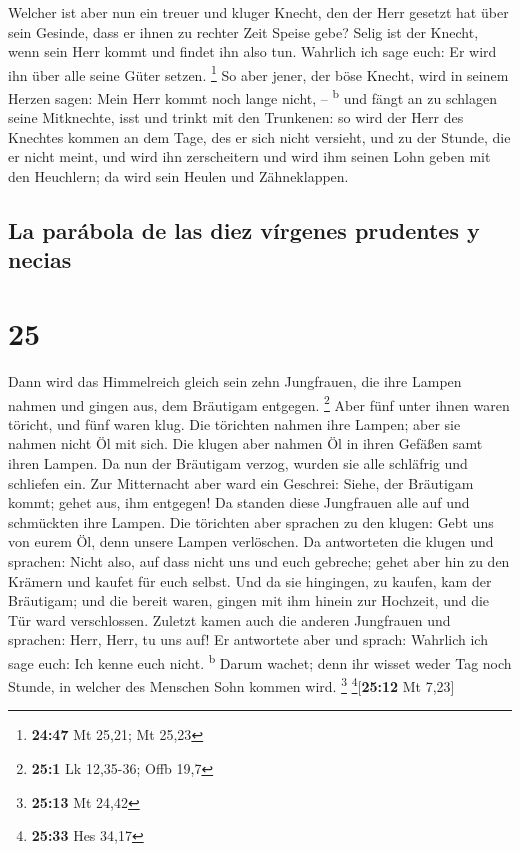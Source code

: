  Welcher ist aber nun ein treuer und kluger Knecht, den
der Herr gesetzt hat über sein Gesinde, dass er ihnen zu rechter Zeit
Speise gebe?  Selig ist der Knecht, wenn sein Herr kommt
und findet ihn also tun.  Wahrlich ich sage euch: Er wird
ihn über alle seine Güter setzen. \footnote{\textbf{24:47} Mt 25,21; Mt
  25,23}  So aber jener, der böse Knecht, wird in seinem
Herzen sagen: Mein Herr kommt noch lange nicht, -- \textsuperscript{b}
 und fängt an zu schlagen seine Mitknechte, isst und
trinkt mit den Trunkenen:  so wird der Herr des Knechtes
kommen an dem Tage, des er sich nicht versieht, und zu der Stunde, die
er nicht meint,  und wird ihn zerscheitern und wird ihm
seinen Lohn geben mit den Heuchlern; da wird sein Heulen und
Zähneklappen.

\hypertarget{la-paruxe1bola-de-las-diez-vuxedrgenes-prudentes-y-necias}{%
\subsection{La parábola de las diez vírgenes prudentes y
necias}\label{la-paruxe1bola-de-las-diez-vuxedrgenes-prudentes-y-necias}}

\hypertarget{section-24}{%
\section{25}\label{section-24}}

 Dann wird das Himmelreich gleich sein zehn Jungfrauen,
die ihre Lampen nahmen und gingen aus, dem Bräutigam entgegen.
\footnote{\textbf{25:1} Lk 12,35-36; Offb 19,7}  Aber fünf
unter ihnen waren töricht, und fünf waren klug.  Die
törichten nahmen ihre Lampen; aber sie nahmen nicht Öl mit sich.
 Die klugen aber nahmen Öl in ihren Gefäßen samt ihren
Lampen.  Da nun der Bräutigam verzog, wurden sie alle
schläfrig und schliefen ein.  Zur Mitternacht aber ward
ein Geschrei: Siehe, der Bräutigam kommt; gehet aus, ihm entgegen!
 Da standen diese Jungfrauen alle auf und schmückten ihre
Lampen.  Die törichten aber sprachen zu den klugen: Gebt
uns von eurem Öl, denn unsere Lampen verlöschen.  Da
antworteten die klugen und sprachen: Nicht also, auf dass nicht uns und
euch gebreche; gehet aber hin zu den Krämern und kaufet für euch selbst.
 Und da sie hingingen, zu kaufen, kam der Bräutigam; und
die bereit waren, gingen mit ihm hinein zur Hochzeit, und die Tür ward
verschlossen.  Zuletzt kamen auch die anderen Jungfrauen
und sprachen: Herr, Herr, tu uns auf!  Er antwortete aber
und sprach: Wahrlich ich sage euch: Ich kenne euch nicht.
\textsuperscript{b}  Darum wachet; denn ihr wisset weder
Tag noch Stunde, in welcher des Menschen Sohn kommen wird. \footnote{\textbf{25:13}
  Mt 24,42} \footnote{\textbf{25:33} Hes 34,17}{[}\textbf{25:12} Mt
7,23{]}

